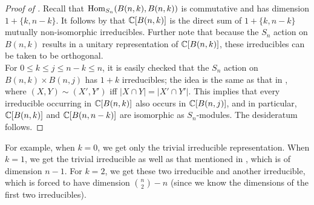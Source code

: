 	\begin{proof}[Proof of ]
		Recall that $\operatorname{Hom}_{S_n}(B(n,k),B(n,k))$ is commutative and has dimension $1+\{k,n-k\}$. It follows by  that $\mathbb{C}[B(n,k)]$ is the direct sum of $1+\{k,n-k\}$ mutually non-isomorphic irreducibles. Further note that because the $S_n$ action on $B(n,k)$ results in a unitary representation of $\mathbb{C}[B(n,k)]$, these irreducibles can be taken to be orthogonal. \\
		For $0 \le k \le j \le n-k \le n$, it is easily checked that the $S_n$ action on $B(n,k) \times B(n,j)$ has $1+k$ irreducibles; the idea is the same as that in , where $(X,Y) \sim (X',Y')$ iff $|X \cap Y| = |X' \cap Y'|$. 
		This implies that every irreducible occurring in $\mathbb{C}[B(n,k)]$ also occurs in $\mathbb{C}[B(n,j)]$, and in particular, $\mathbb{C}[B(n,k)]$ and $\mathbb{C}[B(n,n-k)]$ are isomorphic as $S_n$-modules. The desideratum follows.
	\end{proof}

	For example, when $k=0$, we get only the trivial irreducible representation. When $k=1$, we get the trivial irreducible as well as that mentioned in , which is of dimension $n-1$. For $k=2$, we get these two irreducible and another irreducible, which is forced to have dimension $\binom{n}{2} - n$ (since we know the dimensions of the first two irreducibles).

